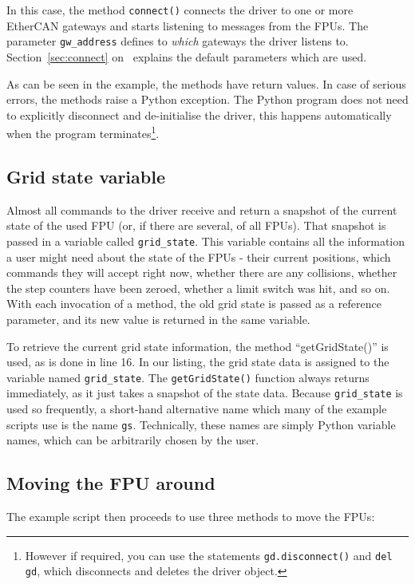 \documentclass[11pt,a4paper]{report}
\begin{document}
In this case, the method \texttt{connect()} connects the driver to one
or more EtherCAN gateways and starts listening to messages from the
FPUs. The parameter \texttt{gw\_address} defines to \emph{which}
gateways the driver listens to. Section~\ref{sec:connect}
on~\pageref{sec:connect} explains the default parameters which are
used.

As can be seen in the example, the methods have return values.  In
case of serious errors, the methods raise a Python exception. The
Python program does not need to explicitly disconnect and
de-initialise the driver, this happens automatically when the program
terminates\footnote{However if required, you can use the statements
  \texttt{gd.disconnect()} and \texttt{del gd}, which disconnects and
  deletes the driver object.}.



\subsection{Grid state variable}
 Almost all commands to the driver
receive and return a snapshot of the current state of the used FPU
(or, if there are several, of all FPUs). That snapshot is passed in a
variable called \texttt{grid\_state}. This variable contains all the
information a user might need about the state of the FPUs - their
current positions, which commands they will accept right now, whether
there are any collisions, whether the step counters have been zeroed,
whether a limit switch was hit, and so on. With each invocation of a
method, the old grid state is passed as a reference parameter, and its
new value is returned in the same variable.

To retrieve the current grid state information, the method
``getGridState()'' is used, as is done in line 16. In our listing, the
grid state data is assigned to the variable named
\texttt{grid\_state}.  The \texttt{getGridState()} function always
returns immediately, as it just takes a snapshot of the state
data. Because \texttt{grid\_state} is used so frequently, a short-hand
alternative name which many of the example scripts use is the name
\texttt{gs}.  Technically, these names are simply Python variable
names, which can be arbitrarily chosen by the user.

\subsection{Moving the FPU around}
The example script then proceeds to use three methods to move
the FPUs:
\end{document}
